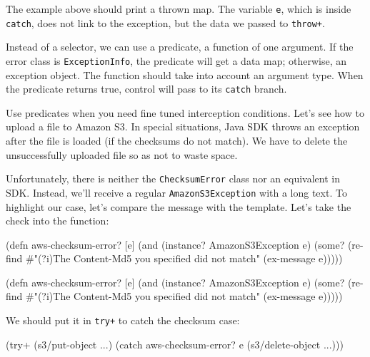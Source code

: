 The example above should print a thrown map. The variable \verb|e|, which is inside \verb|catch|, does not link to the exception, but the data we passed to \verb|throw+|.

Instead of a selector, we can use a predicate, a function of one argument. If the error class is \verb|ExceptionInfo|, the predicate will get a data map; otherwise, an exception object. The function should take into account an argument type. When the predicate returns true, control will pass to its \verb|catch| branch.


Use predicates when you need fine tuned interception conditions. Let's see how to upload a file to Amazon S3. In special situations, Java SDK throws an exception after the file is loaded (if the checksums do not match). We have to delete the unsuccessfully uploaded file so as not to waste space.

\mnoindent
Unfortunately, there is neither the \verb|ChecksumError| class nor an equivalent in SDK. Instead, we'll receive a regular \verb|AmazonS3Exception| with a long text. To highlight our case, let's compare the message with the template. Let's take the check into the function:

\ifx\DEVICETYPE\MOBILE

\begin{english}
  \begin{clojure}
(defn aws-checksum-error? [e]
  (and
    (instance? AmazonS3Exception e)
    (some?
      (re-find
        #"(?i)The Content-Md5
            you specified did not match"
        (ex-message e)))))
  \end{clojure}
\end{english}

\else

\begin{english}
  \begin{clojure}
(defn aws-checksum-error? [e]
  (and (instance? AmazonS3Exception e)
       (some?
        (re-find
         #"(?i)The Content-Md5 you specified did not match"
         (ex-message e)))))
  \end{clojure}
\end{english}

\fi

\noindent
We should put it in \verb|try+| to catch the checksum case:

\begin{english}
  \begin{clojure}
(try+
  (s3/put-object ...)
  (catch aws-checksum-error? e
    (s3/delete-object ...)))
  \end{clojure}
\end{english}

